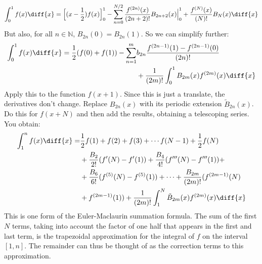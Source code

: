         \begin{equation}
            \int_{0}^{1}f(x)\diff{x}=
            \Big[(x-\frac{1}{2})f(x)\Big]_{0}^{1}-
            \sum_{n=0}^{N/2}\frac{f^{(2n)}(x)}{(2n+2)!}B_{2n+2}(x)
                \Big|_{0}^{1}+\frac{f^{(N)}(x)}{(N)!}B_{N}(x)\diff{x}
        \end{equation}
        But also, for all $n\in\mathbb{N}$, $B_{2n}(0)=B_{2n}(1)$. So we can
        simplify further:
        \begin{equation}
            \begin{split}
                \int_{0}^{1}f(x)\diff{x}=
                    \frac{1}{2}(f(0)+f(1))-\sum_{n=1}^{m}&b_{2n}
                        \frac{f^{(2n-1)}(1)-f^{(2n-1)}(0)}{(2n)!}\\
                    &+\frac{1}{(2m)!}\int_{0}^{1}
                        B_{2m}(x)f^{(2m)}(x)\diff{x}
            \end{split}
        \end{equation}
        Apply this to the function $f(x+1)$. Since this is just a translate,
        the derivatives don't change. Replace $B_{2n}(x)$ with its
        periodic extension $\tilde{B}_{2n}(x)$. Do this for $f(x+N)$ and
        then add the results, obtaining a telescoping series. You obtain:
        \begin{equation}
            \begin{split}
                \int_{1}^{n}f(x)\diff{x}
                    =&\frac{1}{2}f(1)+f(2)+f(3)+
                        \cdots{f}(N-1)+\frac{1}{2}f(N)\\
                        &+\frac{B_{2}}{2!}(f'(N)-f'(1))+
                        \frac{B_{4}}{4!}(f'''(N)-f'''(1))+\\
                        &+\frac{B_{6}}{6!}(f^{(5)}(N)-f^{(5)}(1))+\cdots+
                        \frac{B_{2m}}{(2m)!}(f^{(2m-1)}(N)\\
                        &+f^{(2m-1)}(1))+\frac{1}{(2m)!}\int_{1}^{N}
                        \tilde{B}_{2m}(x)f^{(2m)}(x)\diff{x}
            \end{split}
        \end{equation}
        This is one form of the Euler-Maclaurin summation formula. The sum
        of the first $N$ terms, taking into account the factor of one half
        that appears in the first and last term, is the trapezoidal
        approximation for the integral of $f$ on the interval $[1,n]$. The
        remainder can thus be thought of as the correction terms to this
        approximation.
